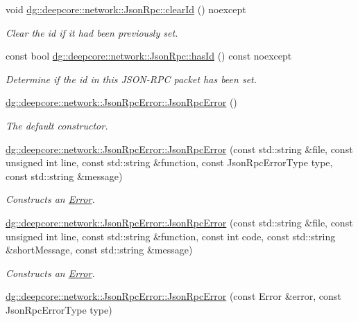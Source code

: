 \begin{DoxyCompactItemize}
void \hyperlink{group___network_module_gaa92eeabe2c022b96d2820a02118dc1b2}{dg\+::deepcore\+::network\+::\+Json\+Rpc\+::clear\+Id} () noexcept
\begin{DoxyCompactList}\small\item\em Clear the id if it had been previously set. \end{DoxyCompactList}\item 
const bool \hyperlink{group___network_module_gaef8ff7e1ae84dc613d31615fa973a521}{dg\+::deepcore\+::network\+::\+Json\+Rpc\+::has\+Id} () const noexcept
\begin{DoxyCompactList}\small\item\em Determine if the id in this J\+S\+O\+N-\/\+R\+PC packet has been set. \end{DoxyCompactList}\item 
\hyperlink{group___network_module_ga6177a0628073de16562fdbaf8ef12f33}{dg\+::deepcore\+::network\+::\+Json\+Rpc\+Error\+::\+Json\+Rpc\+Error} ()
\begin{DoxyCompactList}\small\item\em The default constructor. \end{DoxyCompactList}\item 
\hyperlink{group___network_module_ga041044a45186dbc1faa970ec45ecba81}{dg\+::deepcore\+::network\+::\+Json\+Rpc\+Error\+::\+Json\+Rpc\+Error} (const std\+::string \&file, const unsigned int line, const std\+::string \&function, const Json\+Rpc\+Error\+Type type, const std\+::string \&message)
\begin{DoxyCompactList}\small\item\em Constructs an \hyperlink{classdg_1_1deepcore_1_1_error}{Error}. \end{DoxyCompactList}\item 
\hyperlink{group___network_module_gad7b1e6630b2774ffa45cbcc88b9a1b3f}{dg\+::deepcore\+::network\+::\+Json\+Rpc\+Error\+::\+Json\+Rpc\+Error} (const std\+::string \&file, const unsigned int line, const std\+::string \&function, const int code, const std\+::string \&short\+Message, const std\+::string \&message)
\begin{DoxyCompactList}\small\item\em Constructs an \hyperlink{classdg_1_1deepcore_1_1_error}{Error}. \end{DoxyCompactList}\item 
\hyperlink{group___network_module_ga15642140f0fe7b5bc798cdd884954040}{dg\+::deepcore\+::network\+::\+Json\+Rpc\+Error\+::\+Json\+Rpc\+Error} (const Error \&error, const Json\+Rpc\+Error\+Type type)

\end{DoxyCompactItemize}
